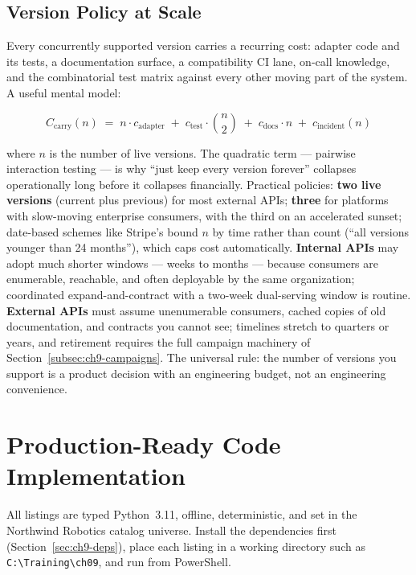 \subsection{Version Policy at Scale}
\label{subsec:ch9-scale}

Every concurrently supported version carries a recurring cost: adapter code
and its tests, a documentation surface, a compatibility CI lane, on-call
knowledge, and the combinatorial test matrix against every other moving part
of the system. A useful mental model:

\begin{equation}
C_{\text{carry}}(n) \;=\; n \cdot c_{\text{adapter}} \;+\; c_{\text{test}} \cdot \binom{n}{2} \;+\; c_{\text{docs}} \cdot n \;+\; c_{\text{incident}}(n)
\label{eq:ch9-cost}
\end{equation}

\noindent where $n$ is the number of live versions. The quadratic term ---
pairwise interaction testing --- is why ``just keep every version forever''
collapses operationally long before it collapses financially. Practical
policies: \textbf{two live versions} (current plus previous) for most
external APIs; \textbf{three} for platforms with slow-moving enterprise
consumers, with the third on an accelerated sunset; date-based schemes like
Stripe's bound $n$ by time rather than count (``all versions younger than 24
months''), which caps cost automatically. \textbf{Internal APIs} may adopt
much shorter windows --- weeks to months --- because consumers are
enumerable, reachable, and often deployable by the same organization;
coordinated expand-and-contract with a two-week dual-serving window is
routine. \textbf{External APIs} must assume unenumerable consumers, cached
copies of old documentation, and contracts you cannot see; timelines stretch
to quarters or years, and retirement requires the full campaign machinery of
Section~\ref{subsec:ch9-campaigns}. The universal rule: the number of
versions you support is a product decision with an engineering budget, not
an engineering convenience.

\section{Production-Ready Code Implementation}
\label{sec:ch9-code}

All listings are typed Python~3.11, offline, deterministic, and set in the
Northwind Robotics catalog universe. Install the dependencies first
(Section~\ref{sec:ch9-deps}), place each listing in a working directory such
as \texttt{C:\textbackslash Training\textbackslash ch09}, and run from
PowerShell.

